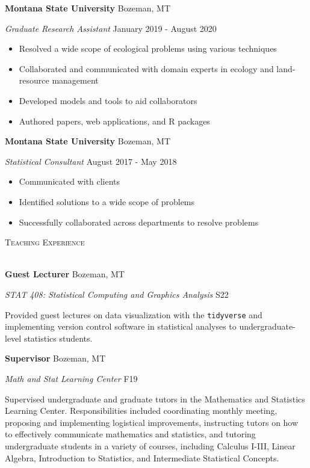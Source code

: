\documentclass[a4paper]{article}
\newcommand{\lineunder} {
	\vspace*{-8pt} \\
	\hspace*{-18pt} \hrulefill \\
}
\newcommand{\header} [1] {
	{\hspace*{-18pt}\vspace*{6pt} \textcolor{Cerulean}{\textsc{#1}}}
	\vspace*{-6pt} \textcolor{Cerulean}{\lineunder}
}
\begin{document}
\textbf{Montana State University} \hfill Bozeman, MT

\textit{Graduate Research Assistant} \hfill January 2019 - August 2020

\vspace{-1mm}
\begin{itemize} \itemsep 1pt
   \item Resolved a wide scope of ecological problems using various techniques
   \item Collaborated and communicated with domain experts in ecology and land-resource management
   \item Developed models and tools to aid collaborators
   \item Authored papers, web applications, and R packages
\end{itemize}

\textbf{Montana State University} \hfill Bozeman, MT

\textit{Statistical Consultant} \hfill August 2017 - May 2018

\vspace{-1mm}
\begin{itemize} \itemsep 1pt
   \item Communicated with clients
   \item Identified solutions to a wide scope of problems
   \item Successfully collaborated across departments to resolve problems
\end{itemize}

\header{Teaching Experience}
\vspace*{2mm}

\textbf{Guest Lecturer} \hfill Bozeman, MT

\emph{STAT 408: Statistical Computing and Graphics Analysis} \hfill S22

Provided guest lectures on data visualization with the
\texttt{tidyverse} and implementing version control software in
statistical analyses to undergraduate-level statistics students.
\vspace*{2mm}

\textbf{Supervisor} \hfill Bozeman, MT

\emph{Math and Stat Learning Center} \hfill F19

Supervised undergraduate and graduate tutors in the Mathematics and
Statistics Learning Center. Responsibilities included coordinating
monthly meeting, proposing and implementing logistical improvements,
instructing tutors on how to effectively communicate mathematics and
statistics, and tutoring undergraduate students in a variety of courses,
including Calculus I-III, Linear Algebra, Introduction to Statistics,
and Intermediate Statistical Concepts.\vspace*{2mm}
\end{document}
